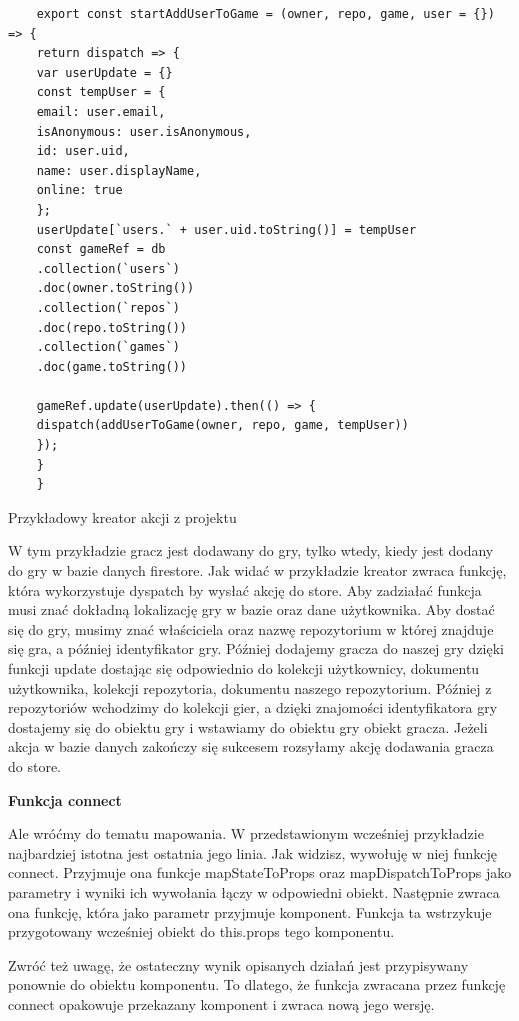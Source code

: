 \begin{listing}
	\begin{verbatim}
	export const startAddUserToGame = (owner, repo, game, user = {}) => {
	return dispatch => {
	var userUpdate = {}
	const tempUser = {
	email: user.email,
	isAnonymous: user.isAnonymous,
	id: user.uid,
	name: user.displayName,
	online: true
	};
	userUpdate[`users.` + user.uid.toString()] = tempUser
	const gameRef = db
	.collection(`users`)
	.doc(owner.toString())
	.collection(`repos`)
	.doc(repo.toString())
	.collection(`games`)
	.doc(game.toString())
	
	gameRef.update(userUpdate).then(() => {
	dispatch(addUserToGame(owner, repo, game, tempUser))
	});
	}
	}
	\end{verbatim}
	\caption{Przykładowy kreator akcji z projektu} \label{listing:firebase_action}
\end{listing}

W tym przykładzie gracz jest dodawany do gry, tylko wtedy, kiedy jest dodany do gry w bazie danych firestore. Jak widać w przykładzie kreator zwraca funkcję, która wykorzystuje dyspatch by wysłać akcję do store. Aby zadziałać funkcja musi znać dokładną lokalizację gry w bazie oraz dane użytkownika. Aby dostać się do gry, musimy znać właściciela oraz nazwę repozytorium w której znajduje się gra, a później identyfikator gry. Później dodajemy gracza do naszej gry dzięki funkcji update dostając się odpowiednio do kolekcji użytkownicy, dokumentu użytkownika, kolekcji repozytoria, dokumentu naszego repozytorium. Później z repozytoriów wchodzimy do kolekcji gier, a dzięki znajomości identyfikatora gry dostajemy się do obiektu gry i wstawiamy do obiektu gry obiekt gracza. Jeżeli akcja w bazie danych zakończy się sukcesem rozsyłamy akcję dodawania gracza do store.
\begin{center}
	\textbf{Funkcja connect}
\end{center}
Ale wróćmy do tematu mapowania. W przedstawionym wcześniej przykładzie najbardziej istotna jest ostatnia jego linia. Jak widzisz, wywołuję w niej funkcję connect. Przyjmuje ona funkcje mapStateToProps oraz mapDispatchToProps jako parametry i wyniki ich wywołania łączy w odpowiedni obiekt. Następnie zwraca ona funkcję, która jako parametr przyjmuje komponent. Funkcja ta wstrzykuje przygotowany wcześniej obiekt do this.props tego komponentu.

Zwróć też uwagę, że ostateczny wynik opisanych działań jest przypisywany ponownie do obiektu komponentu. To dlatego, że funkcja zwracana przez funkcję connect opakowuje przekazany komponent i zwraca nową jego wersję.

